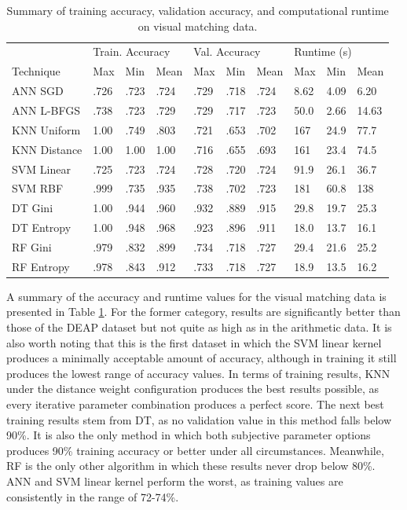 \documentclass[12pt]{uthesis-v12}  %
\begin{document}
\begin{table}[!t]
\caption{Summary of training accuracy, validation accuracy, and computational runtime on visual matching data.}
\renewcommand{\arraystretch}{1.3}
\centering
{\begin{tabular}{*{10}{l}}
\toprule
& \multicolumn{3}{l}{Train. Accuracy} & \multicolumn{3}{l}{Val. Accuracy} & \multicolumn{3}{l}{Runtime (s)} \\
Technique & Max & Min & Mean & Max & Min & Mean & Max & Min & Mean \\ \midrule
ANN SGD & .726 & .723 & .724 & .729 & .718 & .724 & 8.62 & 4.09 & 6.20 \\
ANN L-BFGS & .738 & .723 & .729 & .729 & .717 & .723 & 50.0 & 2.66 & 14.63 \\
KNN Uniform & 1.00 & .749 & .803 & .721 & .653 & .702 & 167 & 24.9 & 77.7 \\
KNN Distance & 1.00 & 1.00 & 1.00 & .716 & .655 & .693 & 161 & 23.4 & 74.5 \\
SVM Linear & .725 & .723 & .724 & .728 & .720 & .724 & 91.9 & 26.1 & 36.7 \\
SVM RBF & .999 & .735 & .935 & .738 & .702 & .723 & 181 & 60.8 & 138 \\
DT Gini & 1.00 & .944 & .960 & .932 & .889 & .915 & 29.8 & 19.7 & 25.3 \\
DT Entropy & 1.00 & .948 & .968 & .923 & .896 & .911 & 18.0 & 13.7 & 16.1 \\
RF Gini & .979 & .832 & .899 & .734 & .718 & .727 & 29.4 & 21.6 & 25.2 \\
RF Entropy & .978 & .843 & .912 & .733 & .718 & .727 & 18.9 & 13.5 & 16.2 \\ \bottomrule
\end{tabular}}

\label{tvr-vismatch}
\end{table}

A summary of the accuracy and runtime values for the visual matching data is presented in Table \ref{tvr-vismatch}. For the former category, results are significantly better than those of the DEAP dataset but not quite as high as in the arithmetic data. It is also worth noting that this is the first dataset in which the SVM linear kernel produces a minimally acceptable amount of accuracy, although in training it still produces the lowest range of accuracy values. In terms of training results, KNN under the distance weight configuration produces the best results possible, as every iterative parameter combination produces a perfect score. The next best training results stem from DT, as no validation value in this method falls below 90\%. It is also the only method in which both subjective parameter options produces 90\% training accuracy or better under all circumstances. Meanwhile, RF is the only other algorithm in which these results never drop below 80\%. ANN and SVM linear kernel perform the worst, as training values are consistently in the range of 72-74\%.
\end{document}
